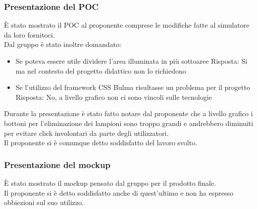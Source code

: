 \documentclass[12pt]{article}
\begin{document}
\subsubsection{Presentazione del POC}
È stato mostrato il POC al proponente comprese le modifiche fatte al simulatore da loro fornitoci.
\\
Dal gruppo è stato inoltre domandato: 
\begin{itemize}
    \item Se poteva essere utile dividere l'area illuminata in più sottoaree
    \subitem Risposta: Si ma nel contesto del progetto didattico non lo richiedono 
    \item Se l'utilizzo del framework CSS Bulma risultasse un problema per il progetto
    \subitem Risposta: No, a livello grafico non ci sono vincoli sulle tecnologie
\end{itemize}

Durante la presentazione è stato fatto notare dal proponente che a livello grafico i bottoni per l'eliminazione dei lampioni sono troppo grandi e andrebbero diminuiti per evitare click involontari da parte degli utilizzatori.
\\Il proponente si è comunque detto soddisfatto del lavoro svolto. 

\subsubsection{Presentazione del mockup}
È stato mostrato il mockup pensato dal gruppo per il prodotto finale.\\

Il proponente si è detto soddisfatto anche di quest'ultimo e non ha espresso obbiezioni sul suo utilizzo.
\end{document}
